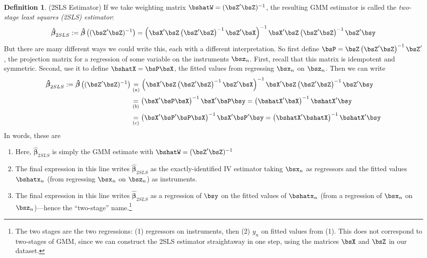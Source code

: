 \documentclass[12pt]{article}
\theoremstyle{plain}
\theoremstyle{definition}
\newtheorem{defn}[thm]{Definition}
\theoremstyle{remark}
\newcommand{\bshatbeta}{\boldsymbol{\hat{\beta}}}
\begin{document}
\begin{defn}(2SLS Estimator)
If we take weighting matrix $\bshatW=(\bsZ'\bsZ)^{-1}$, the resulting
GMM estimator is called the
\emph{two-stage least squares (2SLS) estimator}:
\begin{align*}
  \bshatbeta_{2SLS}
  := \bshatbeta\left((\bsZ'\bsZ)^{-1}\right)
  =
  \left(
  \bsX'\bsZ
  \left(\bsZ'\bsZ\right)^{-1}
  \bsZ'\bsX
  \right)^{-1}
  \bsX'\bsZ\left(\bsZ'\bsZ\right)^{-1}\bsZ'\bsy
\end{align*}
But there are many different ways we could write this, each with a
different interpretation. So first define
$\bsP = \bsZ \left(\bsZ'\bsZ\right)^{-1} \bsZ'$,
the projection matrix for a regression of some variable on the
instruments $\bsz_n$.
First, recall that this matrix is idempotent and symmetric.
Second, use it to define $\bshatX = \bsP\bsX$, the fitted values from
regressing $\bsx_n$ on $\bsz_n$.
Then we can write
\begin{align*}
  \bshatbeta_{2SLS}
  := \bshatbeta\left((\bsZ'\bsZ)^{-1}\right)
  &\underset{(a)}{=}
  \left(
  \bsX'\bsZ
  \left(\bsZ'\bsZ\right)^{-1}
  \bsZ'\bsX
  \right)^{-1}
  \bsX'\bsZ\left(\bsZ'\bsZ\right)^{-1}\bsZ'\bsy
  \\
  &\underset{(b)}{=}
  \left(
  \bsX'\bsP\bsX
  \right)^{-1}
  \bsX'\bsP\bsy
  =
  \left(
  \bshatX'\bsX
  \right)^{-1}
  \bshatX'\bsy
  \\
  &\underset{(c)}{=}
  \left(
  \bsX'\bsP'\bsP\bsX
  \right)^{-1}
  \bsX'\bsP'\bsy
  =
  \left(
  \bshatX'\bshatX
  \right)^{-1}
  \bshatX'\bsy
\end{align*}
In words, these are
\begin{enumerate}[label=(\alph*)]
  \item Here, $\bshatbeta_{2SLS}$ is simply the GMM estimate with
    $\bshatW = (\bsZ'\bsZ)^{-1}$
  \item The final expression in this line writes $\bshatbeta_{2SLS}$ as
    the exactly-identified IV estimator taking $\bsx_n$ as regressors
    and the fitted values $\bshatx_n$ (from regressing $\bsx_n$ on
    $\bsz_n$) as instruments.
  \item The final expression in this line writes $\bshatbeta_{2SLS}$ as
    a regression of $\bsy$ on the fitted values of $\bshatx_n$ (from a
    regression of $\bsx_n$ on $\bsz_n$)---hence the
    ``two-stage'' name.\footnote{%
      The two stages are the two regressions: (1) regressors on instruments,
      then (2) $y_n$ on fitted values from (1). This does not correspond to
      two-stages of GMM, since we can construct the 2SLS estimator
      straightaway in one step, using the matrices $\bsX$ and $\bsZ$ in
      our dataset.
    }
\end{enumerate}
\end{defn}
\end{document}
